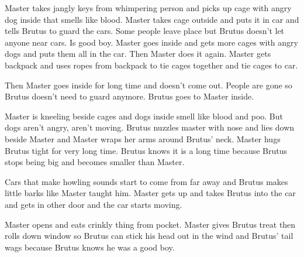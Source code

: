 Master takes jangly keys from whimpering person and picks up cage with angry dog inside that smells like blood.  Master takes cage outside and puts it in car and tells Brutus to guard the cars.  Some people leave place but Brutus doesn't let anyone near cars.  Is good boy.  Master goes inside and gets more cages with angry dogs and puts them all in the car.  Then Master does it again.  Master gets backpack and uses ropes from backpack to tie cages together and tie cages to car.



Then Master goes inside for long time and doesn't come out.  People are gone so Brutus doesn't need to guard anymore.  Brutus goes to Master inside.



Master is kneeling beside cages and dogs inside smell like blood and poo.  But dogs aren't angry, aren't moving.  Brutus nuzzles master with nose and lies down beside Master and Master wraps her arms around Brutus' neck.  Master hugs Brutus tight for very long time.  Brutus knows it is a long time because Brutus stops being big and becomes smaller than Master.



Cars that make howling sounds start to come from far away and Brutus makes little barks like Master taught him.  Master gets up and takes Brutus into the car and gets in other door and the car starts moving.



Master opens and eats crinkly thing from pocket.  Master gives Brutus treat then rolls down window so Brutus can stick his head out in the wind and Brutus' tail wags because Brutus knows he was a good boy.





